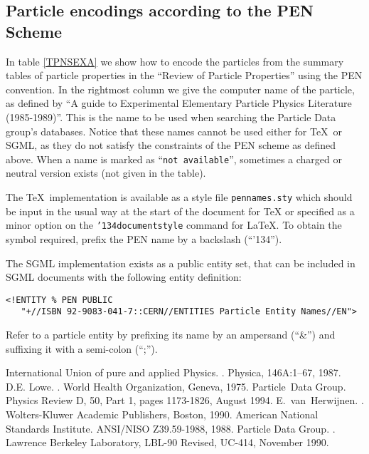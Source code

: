 \documentclass{article}
\newcommand{\bs}{{\ttfamily\char'134}}%
\begin{document}
\subsection[]{Particle encodings according to the PEN Scheme}
 
In table  \ref{TPNSEXA} we show how to encode the particles from
the summary tables of particle
properties in the ``Review of Particle Properties''\cite{PPD}
using the PEN convention.
In the rightmost column we give the computer name of the particle,
as defined by ``A guide to Experimental Elementary Particle
Physics Literature (1985-1989)''\cite{EPPLIT}. This
is the name to be used when
searching the Particle Data group's databases. Notice that these
names cannot be used either for \TeX\ or SGML, as they
do not satisfy the constraints of the PEN scheme as defined above.
When a name is marked as ``\texttt{not available}'', sometimes a charged
or neutral version exists (not given in the table).
 
The \TeX\ implementation is available as a style file
\texttt{pennames.sty} which should be input in the usual way
at the start of the document for \TeX{} or specified as a
minor option on the {\tt\bs documentstyle} command for \LaTeX.
To obtain the symbol
required, prefix the PEN name by a backslash (``\bs'').
 
The SGML implementation exists as a public entity set, that can
be included in SGML documents with the following entity definition:
\begin{verbatim}
<!ENTITY % PEN PUBLIC
   "+//ISBN 92-9083-041-7::CERN//ENTITIES Particle Entity Names//EN">
\end{verbatim}
Refer to a particle entity by prefixing its name by an ampersand (``\&'')
and suffixing it with a semi-colon (``;'').
 
\begin{thebibliography}{1}
 
International Union of pure and applied Physics.
.
\newblock Physica, 146A:1--67, 1987.
D.E. Lowe.
.
\newblock World Health Organization, Geneva, 1975.
Particle~Data Group.
\newblock Physics Review D, 50, Part 1, pages 1173-1826, August 1994.
E.~van~Herwijnen.
.
\newblock Wolters-Kluwer Academic Publishers, Boston, 1990.
American National Standards Institute.
\newblock ANSI/NISO Z39.59-1988, 1988.
Particle Data Group.
.
\newblock Lawrence Berkeley Laboratory, LBL-90 Revised, UC-414, November 1990.
 
\end{thebibliography}
 
\end{document}
